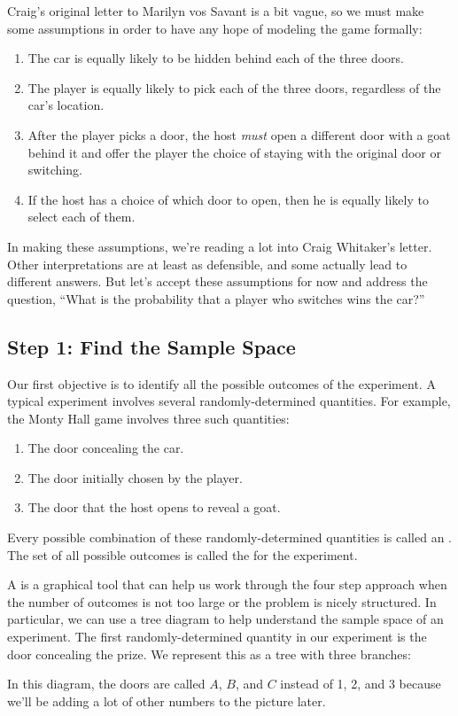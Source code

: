 Craig's original letter to Marilyn vos Savant is a bit vague, so we
must make some assumptions in order to have any hope of modeling the
game formally:
%
\begin{enumerate}

\item The car is equally likely to be hidden behind each of the three
doors.

\item The player is equally likely to pick each of the three doors,
regardless of the car's location.

\item After the player picks a door, the host {\em must} open a
different door with a goat behind it and offer the player the choice
of staying with the original door or switching.

\item If the host has a choice of which door to open, then he is
equally likely to select each of them.

\end{enumerate}
%
In making these assumptions, we're reading a lot into Craig Whitaker's
letter.  Other interpretations are at least as defensible, and some
actually lead to different answers.  But let's accept these
assumptions for now and address the question, ``What is the
probability that a player who switches wins the car?''

\subsection{Step 1:  Find the Sample Space}

Our first objective is to identify all the possible outcomes of the
experiment.  A typical experiment involves several randomly-determined
quantities.  For example, the Monty Hall game involves three such
quantities:
%
\begin{enumerate}
\item The door concealing the car.
\item The door initially chosen by the player.
\item The door that the host opens to reveal a goat.
\end{enumerate}
%
Every possible combination of these randomly-determined quantities is
called an .  The set of all possible outcomes is called
the  for the experiment.

A  is a graphical tool that can help us work
through the four step approach when the number of outcomes is not too
large or the problem is nicely structured.  In particular, we can use
a tree diagram to help understand the sample space of an experiment.
The first randomly-determined quantity in our experiment is the door
concealing the prize.  We represent this as a tree with three
branches:
\begin{center}
\end{center}
In this diagram, the doors are called $A$, $B$, and $C$ instead of 1, 2,
and 3 because we'll be adding a lot of other numbers to the picture later.

